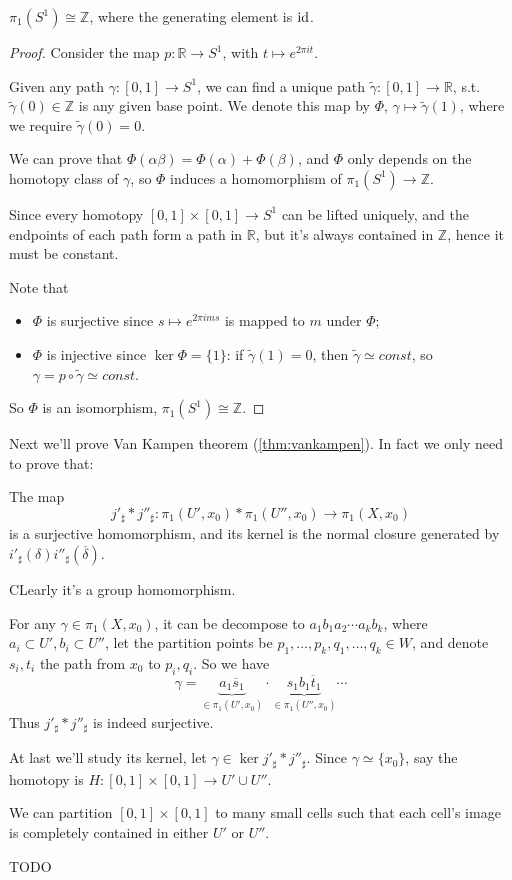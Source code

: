 \begin{theorem}
    $\pi_1(S^1) \cong \mathbb{Z}$, where the generating element is $\operatorname{id}$.
\end{theorem}
\begin{proof}[Proof]
    Consider the map $p: \mathbb{R}\to S^1$, with $t\mapsto e^{2\pi it}$.

	Given any path $\gamma: [0,1]\to S^1$, we can find a unique
	path $\tilde \gamma: [0,1]\to \mathbb{R}$, s.t. $\tilde\gamma(0)\in \mathbb{Z}$ is
	any given base point.
	We denote this map by $\Phi$, $\gamma\mapsto \tilde\gamma(1)$,
	where we require $\tilde\gamma(0) = 0$.

	We can prove that $\Phi(\alpha\beta) = \Phi(\alpha)+\Phi(\beta)$,
	and $\Phi$ only depends on the homotopy class of $\gamma$,
	so $\Phi$ induces a homomorphism of $\pi_1(S^1) \to \mathbb{Z}$.
	\begin{remark}
		Since every homotopy $[0,1]\times [0,1]\to S^1$ can be lifted uniquely,
		and the endpoints of each path form a path in $\mathbb{R}$,
		but it's always contained in $\mathbb{Z}$, hence it must be constant.
	\end{remark}

	Note that
	\begin{itemize}
		\item $\Phi$ is surjective since $s\mapsto e^{2\pi i m s}$ is mapped
			to $m$ under $\Phi$;
		\item $\Phi$ is injective since $\ker \Phi = \{1\}$:
			if $\tilde\gamma(1) = 0$, then $\tilde\gamma \simeq const$,
			so $\gamma = p\circ \tilde\gamma \simeq const$.
	\end{itemize}

	So $\Phi$ is an isomorphism, $\pi_1(S^1) \cong \mathbb{Z}$.
\end{proof}

Next we'll prove Van Kampen theorem (\ref{thm:vankampen}).
In fact we only need to prove that:
\begin{claim}
	The map
	\[
	j'_\sharp * j''_\sharp : \pi_1(U', x_0) * \pi_1(U'', x_0)\to \pi_1(X, x_0)
	\]
	is a surjective homomorphism, and its kernel is the normal closure generated by
	$i'_\sharp(\delta)i''_\sharp(\overline{\delta})$.
\end{claim}

CLearly it's a group homomorphism.

For any $\gamma \in \pi_1(X, x_0)$, it can be decompose to $a_1b_1a_2\cdots a_kb_k$,
where $a_i \subset U', b_i \subset U''$, let the partition points be
$p_1, \dots, p_k, q_1, \dots, q_k\in W$,
and denote $s_i, t_i$ the path from $x_0$ to $p_i, q_i$.
So we have
\[
	\gamma = \underbrace{a_1\overline{s}_1}_{\in \pi_1(U', x_0)}
	\cdot \underbrace{s_1b_1\overline{t}_1}_{\in \pi_1(U'', x_0)} \cdots
\]
Thus $j'_\sharp * j''_\sharp$ is indeed surjective.

At last we'll study its kernel, let $\gamma\in \ker j'_\sharp * j''_\sharp$.
Since $\gamma \simeq \{x_0\}$,
say the homotopy is $H: [0,1]\times [0,1] \to U'\cup U''$.

We can partition $[0,1] \times [0,1]$ to many small cells such that
each cell's image is completely contained in either $U'$ or $U''$.

TODO
